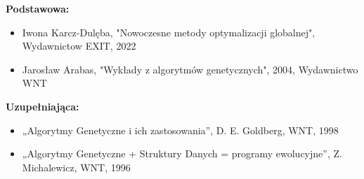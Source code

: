\documentclass[12pt, a4paper]{article}
\begin{document}
\textbf{Podstawowa:}
\begin{itemize}
  \item Iwona Karcz-Dulęba, "Nowoczesne metody optymalizacji globalnej", Wydawnictow EXIT, 2022
  \item Jarosław Arabas, "Wykłady z algorytmów genetycznych", 2004, Wydawnictwo WNT
\end{itemize}

\textbf{Uzupełniająca:}
\begin{itemize}
  \item „Algorytmy Genetyczne i ich zastosowania”, D. E. Goldberg, WNT, 1998
  \item „Algorytmy Genetyczne + Struktury Danych = programy ewolucyjne”, Z. Michalewicz, WNT, 1996
\end{itemize}
\end{document}
